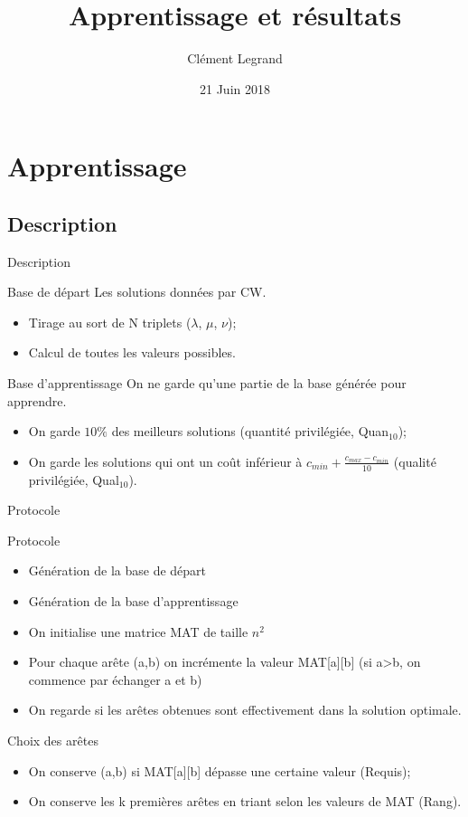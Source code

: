 \documentclass{beamer}
\title{Apprentissage et résultats}
\author{Clément Legrand}
\date{21 Juin 2018}
\begin{document}
\begin{frame}[plain]
\titlepage
\end{frame}

\section{Apprentissage}

\subsection{Description}

\begin{frame}{Description}
\begin{block}{Base de départ}
Les solutions données par CW.
\begin{itemize}
\item Tirage au sort de N triplets ($\lambda$, $\mu$, $\nu$);
\item Calcul de toutes les valeurs possibles.
\end{itemize}
\end{block}

\begin{block}{Base d'apprentissage}
On ne garde qu'une partie de la base générée pour apprendre.
\begin{itemize}
\item On garde $10\%$ des meilleurs solutions (quantité privilégiée, Quan$_{10}$);
\item On garde les solutions qui ont un coût inférieur à $c_{min} + \frac{c_{max}-c_{min}}{10}$ (qualité privilégiée, Qual$_{10}$).
\end{itemize}
\end{block}
\end{frame}

\begin{frame}{Protocole}

\begin{exampleblock}{Protocole}
\begin{itemize}
\item Génération de la base de départ
\item Génération de la base d'apprentissage
\item On initialise une matrice MAT de taille $n^2$
\item Pour chaque arête (a,b) on incrémente la valeur MAT[a][b] (si a>b, on commence par échanger a et b)
\item On regarde si les arêtes obtenues sont effectivement dans la solution optimale.
\end{itemize}
\end{exampleblock}

\begin{block}{Choix des arêtes}
\begin{itemize}
\item On conserve (a,b) si MAT[a][b] dépasse une certaine valeur (Requis);
\item On conserve les k premières arêtes en triant selon les valeurs de MAT (Rang).
\end{itemize}
\end{block}

\end{frame}
\end{document}
